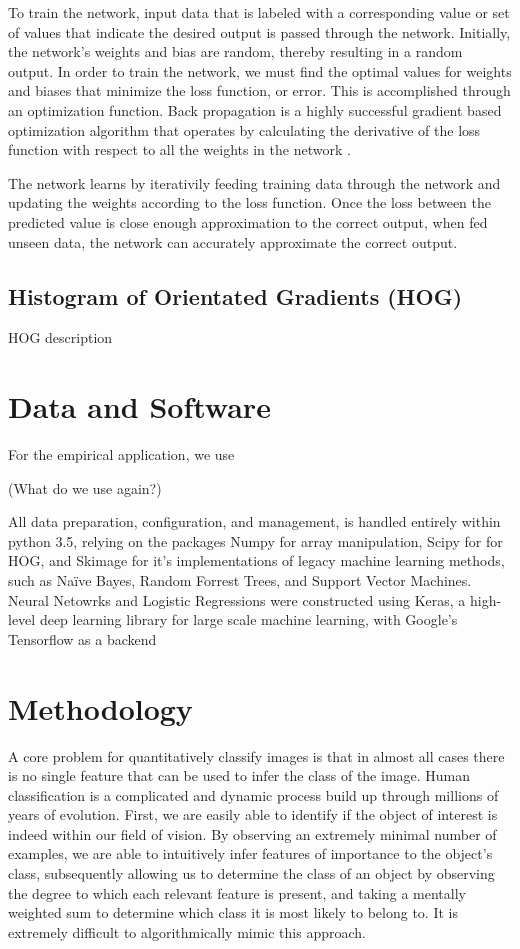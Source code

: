 \documentclass[%
 aip,
 jmp,%
 amsmath,amssymb,
 reprint,%
]{revtex4-1}
\begin{document}
To train the network, input data that is labeled with a corresponding value or set of values that indicate the desired output is passed through the network. Initially, the network's weights and bias are random, thereby resulting in a random output. In order to train the network, we must find the optimal values for weights and biases that minimize the loss function, or error. This is accomplished through an optimization function. Back propagation is a highly successful gradient based optimization algorithm that operates by calculating the derivative of the loss function with respect to all the weights in the network \cite{LSTM2}.


The network learns by iterativily feeding training data through the network and updating the weights according to the loss function. Once the loss between the predicted value is close enough approximation to the correct output, when fed unseen data, the network can accurately approximate the correct output. 

\subsection{\label{sec:level2}Histogram of Orientated Gradients (HOG)}

HOG description

\section{Data and Software}

For the empirical application, we use 

(What do we use again?)

All data preparation, configuration, and management, is handled entirely within python 3.5, relying on the packages Numpy for array manipulation, Scipy for for HOG, and Skimage for it's implementations of legacy machine learning methods, such as Naïve Bayes, Random Forrest Trees, and Support Vector Machines. Neural Netowrks and Logistic Regressions were constructed using Keras, a high-level deep learning library for large scale machine learning, with Google's Tensorflow as a backend  

\section{Methodology} 
 

A core problem for quantitatively classify images is that in almost all cases there is no single feature that can be used to infer the class of the image. Human classification is a complicated and dynamic process build up through millions of years of evolution. First, we are easily able to identify if the object of interest is indeed within our field of vision. By observing an extremely minimal number of examples, we are able to intuitively infer features of importance to the object's class, subsequently allowing us to determine the class of an object by observing the degree to which each relevant feature is present, and taking a mentally weighted sum to determine which class it is most likely to belong to. It is extremely difficult to algorithmically mimic this approach.
\end{document}
